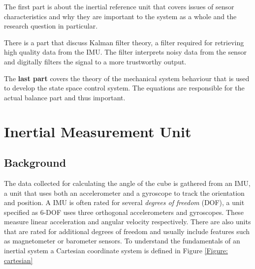 \documentclass[a4paper,11pt]{kth-mag}
\begin{document}
The first part is about the inertial reference unit that covers issues of sensor characteristics and why they are important to the system as a whole and the research question in particular.

There is a part that discuss Kalman filter theory, a filter required for retrieving high quality data from the IMU. The filter interprets noisy data from the sensor and digitally filters the signal to a more trustworthy output. 

The \textbf{last part} covers the theory of the mechanical system behaviour that is used to develop the state space control system. The equations are responsible for the actual balance part and thus important. 



\section{Inertial Measurement Unit} \label{section:IMU}
\subsection{Background}
The data collected for calculating the angle of the cube is gathered from an IMU, a unit that uses both an accelerometer and a gyroscope to track the orientation and position. A IMU is often rated for several \textit{degrees of freedom} (DOF), a unit specified as 6-DOF uses three orthogonal accelerometers and gyroscopes. These measure linear acceleration and angular velocity respectively. There are also units that are rated for additional degrees of freedom and usually include features such as magnetometer or barometer sensors.   
To understand the fundamentals of an inertial system a Cartesian coordinate system is defined in Figure \ref{Figure: cartesian}
\end{document}
